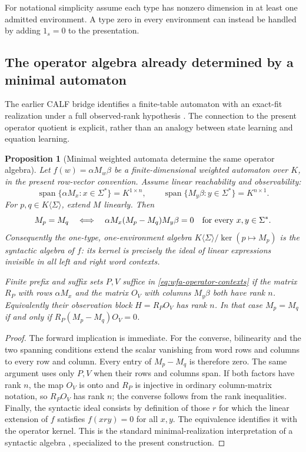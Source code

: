 \documentclass[11pt]{article}
\newtheorem{proposition}[theorem]{Proposition}
\theoremstyle{definition}
\theoremstyle{remark}\newtheorem{remark}[theorem]{Remark}
\begin{document}
For notational simplicity assume each type has nonzero dimension in at
least one admitted environment. A type zero in every environment can
instead be handled by adding $1_s=0$ to the presentation.

\subsection{The operator algebra already determined by a minimal automaton}
The earlier CALF bridge identifies a finite-table automaton with an exact-fit
realization under a full observed-rank hypothesis \cite{bridge-note}.
The connection to the present operator quotient is explicit, rather than
an analogy between state learning and equation learning.

\begin{proposition}[Minimal weighted automata determine the same operator algebra]
\label{prop:wfa-algebra}
Let $f(w)=\alpha M_w\beta$ be a finite-dimensional weighted automaton over
$K$, in the present row-vector convention. Assume linear reachability and
observability:
\[
 \operatorname{span}\{\alpha M_x:x\in\Sigma^*\}=K^{1\times n},
 \qquad
 \operatorname{span}\{M_y\beta:y\in\Sigma^*\}=K^{n\times1}.
\]
For $p,q\in K\langle\Sigma\rangle$, extend $M$ linearly. Then
\begin{equation}\label{eq:wfa-operator-contexts}
 M_p=M_q\quad\Longleftrightarrow\quad
 \alpha M_x(M_p-M_q)M_y\beta=0
 \quad\hbox{for every }x,y\in\Sigma^*.
\end{equation}
Consequently the one-type, one-environment algebra
$K\langle\Sigma\rangle/\ker(p\mapsto M_p)$ is the syntactic algebra of
$f$: its kernel is precisely the ideal of linear expressions invisible
in all left and right word contexts.

Finite prefix and suffix sets $P,V$ suffice in
\eqref{eq:wfa-operator-contexts} if the matrix $R_P$ with rows
$\alpha M_x$ and the matrix $O_V$ with columns $M_y\beta$ both have
rank $n$. Equivalently their observation block $H=R_PO_V$ has rank $n$.
In that case $M_p=M_q$ if and only if
$R_P(M_p-M_q)O_V=0$.
\end{proposition}
\begin{proof}
The forward implication is immediate. For the converse, bilinearity and
the two spanning conditions extend the scalar vanishing from word rows
and columns to every row and column. Every entry of $M_p-M_q$ is therefore
zero. The same argument uses only $P,V$ when their rows and columns span.
If both factors have rank $n$, the map $O_V$ is onto and $R_P$ is
injective in ordinary column-matrix notation, so $R_PO_V$ has rank $n$;
the converse follows from the rank inequalities. Finally, the syntactic
ideal consists by definition of those $r$ for which the linear extension
of $f$ satisfies $f(xry)=0$ for all $x,y$. The equivalence identifies it
with the operator kernel. This is the standard minimal-realization
interpretation of a syntactic algebra \cite{reutenauer}, specialized to
the present construction.
\end{proof}
\end{document}
